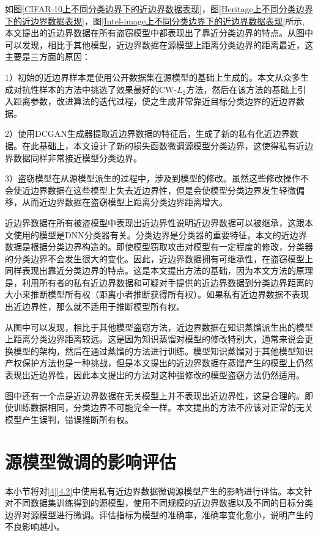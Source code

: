 如图\ref{CIFAR-10上不同分类边界下的近边界数据表现}，图\ref{Heritage上不同分类边界下的近边界数据表现}，图\ref{Intel-image上不同分类边界下的近边界数据表现}所示, 本文提出的近边界数据在所有盗窃模型中都表现出了靠近分类边界的特点。从图中可以发现，相比于其他模型，近边界数据在源模型上距离分类边界的距离最近，这主要是三方面的原因：

1）初始的近边界样本是使用公开数据集在源模型的基础上生成的。本文从众多生成对抗性样本的方法中挑选了效果最好的CW-$L_2$方法，然后在该方法的基础上引入距离参数，改进算法的迭代过程，使之生成非常靠近目标分类边界的近边界数据。

2）使用DCGAN生成器提取近边界数据的特征后，生成了新的私有化近边界数据。在此基础上，本文设计了新的损失函数微调源模型分类边界，这使得私有近边界数据同样非常接近模型分类边界。

3）盗窃模型在从源模型派生的过程中，涉及到模型的修改。虽然这些修改操作不会使近边界数据在这些模型上失去近边界性，但是会使模型分类边界发生轻微偏移，从而近边界数据在盗窃模型上距离分类边界距离增大。


近边界数据在所有被盗模型中表现出近边界性说明近边界数据可以被继承，这跟本文使用的模型是DNN分类器有关。分类边界是分类器的重要特征，本文的近边界数据是根据分类边界构造的。即使模型窃取攻击对模型有一定程度的修改，分类器的分类边界不会发生很大的变化。因此，近边界数据拥有可继承性，在盗窃模型上同样表现出靠近分类边界的特点。这是本文提出方法的基础，因为本文方法的原理是，利用所有者的私有近边界数据和可疑对手提供的近边界数据到分类边界距离的大小来推断模型所有权（距离小者推断获得所有权）。如果私有近边界数据不表现出近边界性，那么就不适用于推断模型所有权。

从图中可以发现，相比于其他模型盗窃方法，近边界数据在知识蒸馏派生出的模型上距离分类边界距离较远。这是因为知识蒸馏对模型的修改特别大，通常来说会更换模型的架构，然后在通过蒸馏的方法进行训练。模型知识蒸馏对于其他模型知识产权保护方法也是一种挑战，但是本文提出的近边界数据在蒸馏产生的模型上仍然表现出近边界性，因此本文提出的方法对这种强修改的模型盗窃方法仍然适用。

图中还有一个点是近边界数据在无关模型上并不表现出近边界性，这是合理的。即使训练数据相同，分类边界不可能完全一样。本文提出的方法不应该对正常的无关模型产生误判，错误推断所有权。


\section{源模型微调的影响评估}\label{5.5}

本小节将对\ref{4}\ref{4.2}中使用私有近边界数据微调源模型产生的影响进行评估。本文针对不同数据集训练得到的源模型，使用不同规模的近边界数据以及不同的目标分类边界对源模型进行微调。评估指标为模型的准确率，准确率变化愈小，说明产生的不良影响越小。


